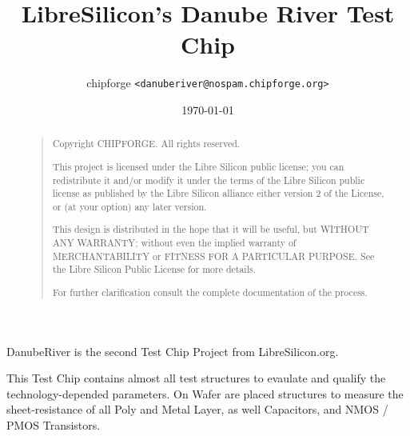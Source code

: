 \documentclass[10pt,a4paper]{report}
\title{LibreSilicon's Danube River Test Chip}
\author{chipforge \texttt{<danuberiver@nospam.chipforge.org>}}
\date{\today}
\begin{document}
\maketitle

\begin{abstract}
\begin{quote}
Copyright  CHIPFORGE. All rights reserved.

This project is licensed under the Libre Silicon public license; you can redistribute it and/or modify it under the terms of the Libre Silicon public license as published by the Libre Silicon alliance either version 2 of the License, or (at your option) any later version.

This design is distributed in the hope that it will be useful, but WITHOUT ANY WARRANTY; without even the implied warranty of MERCHANTABILITY or FITNESS FOR A PARTICULAR PURPOSE. See the Libre Silicon Public License for more details.

For further clarification consult the complete documentation of the process.
\end{quote}
\end{abstract}

DanubeRiver is the second Test Chip Project from LibreSilicon.org.


This Test Chip contains almost all test structures to evaulate and qualify the technology-depended parameters.
On Wafer are placed structures to measure the sheet-resistance of all Poly and Metal Layer, as well Capacitors, and NMOS / PMOS Transistors.

\clearpage
\tableofcontents









\end{document}
